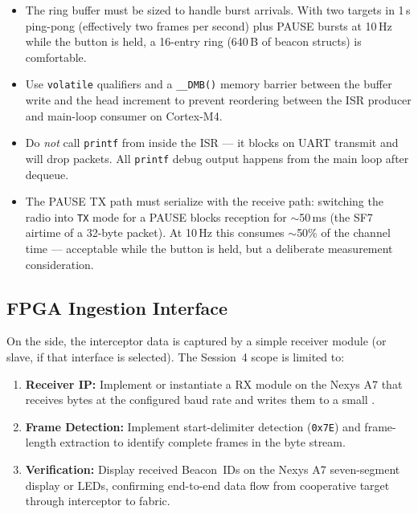 \documentclass[11pt,letterpaper]{article}
\begin{document}
	\begin{tcolorbox}[warning={Concurrency Considerations}]
		\begin{itemize}
			\item The ring buffer must be sized to handle burst arrivals. With two targets in 1\,s ping-pong (effectively two frames per second) plus PAUSE bursts at 10\,Hz while the button is held, a 16-entry ring (640\,B of beacon structs) is comfortable.
			\item Use \texttt{volatile} qualifiers and a \texttt{\_\_DMB()} memory barrier between the buffer write and the head increment to prevent reordering between the ISR producer and main-loop consumer on Cortex-M4.
			\item Do \emph{not} call \HAL{} \texttt{printf} from inside the ISR --- it blocks on UART transmit and will drop \RF{} packets. All \texttt{printf} debug output happens from the main loop after dequeue.
			\item The PAUSE TX path must serialize with the receive path: switching the radio into \texttt{TX} mode for a PAUSE blocks reception for $\sim$50\,ms (the SF7 airtime of a 32-byte packet). At 10\,Hz this consumes $\sim$50\% of the channel time --- acceptable while the button is held, but a deliberate measurement consideration.
		\end{itemize}
	\end{tcolorbox}

	\subsection{FPGA Ingestion Interface}

	On the \FPGA{} side, the interceptor data is captured by a simple \UART{} receiver module (or \SPI{} slave, if that interface is selected). The Session~4 scope is limited to:

	\begin{enumerate}[leftmargin=2em]
		\item \textbf{\UART{} Receiver IP:} Implement or instantiate a \UART{} RX module on the Nexys A7 that receives bytes at the configured baud rate and writes them to a small \FIFO{}.
		\item \textbf{Frame Detection:} Implement start-delimiter detection (\texttt{0x7E}) and frame-length extraction to identify complete frames in the byte stream.
		\item \textbf{Verification:} Display received Beacon~IDs on the Nexys A7 seven-segment display or LEDs, confirming end-to-end data flow from cooperative target through interceptor to \FPGA{} fabric.
	\end{enumerate}
\end{document}
